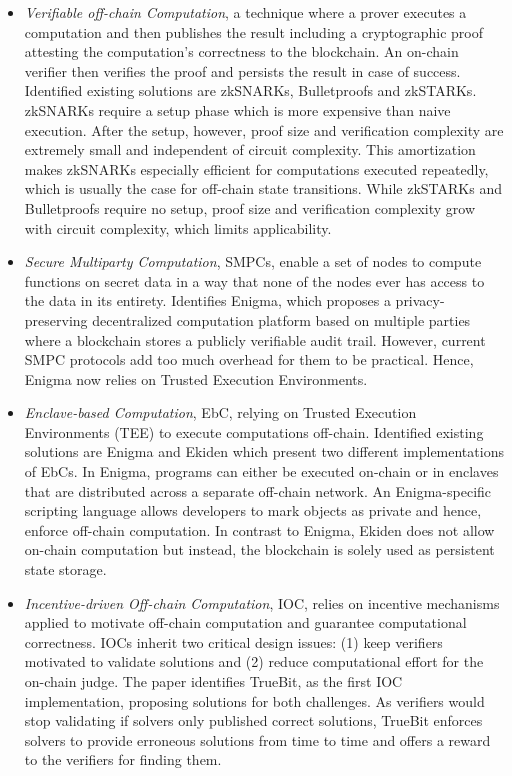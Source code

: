 \begin{itemize}
  \item \textit{Verifiable off-chain Computation}, a technique where a prover executes a computation and then publishes the result including a cryptographic proof attesting the computation’s correctness to the blockchain. An on-chain verifier then verifies the proof and persists the result in case of success. Identified existing solutions are zkSNARKs, Bulletproofs and zkSTARKs. zkSNARKs require a setup phase which is more expensive than naive execution. After the setup, however, proof size and verification complexity are extremely small and independent of circuit complexity. This amortization makes zkSNARKs especially efficient for computations executed repeatedly, which is usually the case for off-chain state transitions. While zkSTARKs and Bulletproofs require no setup, proof size and verification complexity grow with circuit complexity, which limits applicability.
  \item \textit{Secure Multiparty Computation}, SMPCs, enable a set of nodes to compute functions on secret data in a way that none of the nodes ever has access to the data in its entirety. Identifies Enigma, which proposes a privacy-preserving decentralized computation platform based on multiple parties where a blockchain stores a publicly verifiable audit trail. However, current SMPC protocols add too much overhead for them to be practical. Hence, Enigma now relies on Trusted Execution Environments.


  \item \textit{Enclave-based Computation}, EbC, relying on Trusted Execution Environments (TEE) to execute computations off-chain. Identified existing solutions are Enigma and Ekiden which present two different implementations of EbCs. In Enigma, programs can either be executed on-chain or in enclaves that are distributed across a separate off-chain network. An Enigma-specific scripting language allows developers to mark objects as private and hence, enforce off-chain computation. In contrast to Enigma, Ekiden does not allow on-chain computation but instead, the blockchain is solely used as persistent state storage.


  \item \textit{Incentive-driven Off-chain Computation}, IOC, relies on incentive mechanisms applied to motivate off-chain computation and guarantee computational correctness. IOCs inherit two critical design issues: (1) keep verifiers motivated to validate solutions and (2) reduce computational effort for the on-chain judge. The paper identifies TrueBit, as the first IOC implementation, proposing solutions for both challenges. As verifiers would stop validating if solvers only published correct solutions, TrueBit enforces solvers to provide erroneous solutions from time to time and offers a reward to the verifiers for finding them.


\end{itemize}
